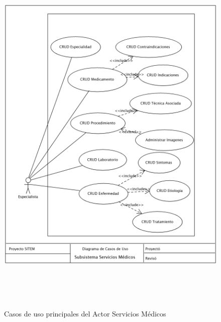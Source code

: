 \begin{figure}
 \centering
 \includegraphics[width=156mm, height=182mm]{casos_servicios.png}
 \caption{Casos de uso principales del Actor Servicios Médicos}
 \label{casos_servicios}
\end{figure}

